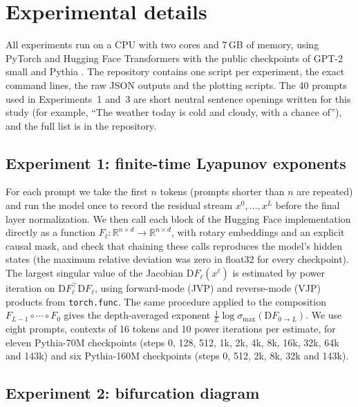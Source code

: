 \section{Experimental details}
\label{app:details}

All experiments run on a CPU with two cores and 7\,GB of memory, using PyTorch and Hugging Face Transformers with the public checkpoints of GPT-2 small \citep{radford2019language} and Pythia \citep{biderman2023pythia}. The repository contains one script per experiment, the exact command lines, the raw JSON outputs and the plotting scripts. The 40 prompts used in Experiments~1 and~3 are short neutral sentence openings written for this study (for example, ``The weather today is cold and cloudy, with a chance of''), and the full list is in the repository.

\subsection{Experiment 1: finite-time Lyapunov exponents}
\label{app:exp1}

For each prompt we take the first $n$ tokens (prompts shorter than $n$ are repeated) and run the model once to record the residual stream $x^0,\dots,x^L$ before the final layer normalization. We then call each block of the Hugging Face implementation directly as a function $F_\ell:\mathbb{R}^{n\times d}\to\mathbb{R}^{n\times d}$, with rotary embeddings and an explicit causal mask, and check that chaining these calls reproduces the model's hidden states (the maximum relative deviation was zero in float32 for every checkpoint). The largest singular value of the Jacobian $\mathrm{D}F_\ell(x^\ell)$ is estimated by power iteration on $\mathrm{D}F_\ell^{\top}\mathrm{D}F_\ell$, using forward-mode (JVP) and reverse-mode (VJP) products from \texttt{torch.func}. The same procedure applied to the composition $F_{L-1}\circ\cdots\circ F_0$ gives the depth-averaged exponent $\frac{1}{L}\log\sigma_{\max}(\mathrm{D}F_{0\to L})$. We use eight prompts, contexts of 16 tokens and 10 power iterations per estimate, for eleven Pythia-70M checkpoints (steps 0, 128, 512, 1k, 2k, 4k, 8k, 16k, 32k, 64k and 143k) and six Pythia-160M checkpoints (steps 0, 512, 2k, 8k, 32k and 143k).

\subsection{Experiment 2: bifurcation diagram}
\label{app:exp2}

